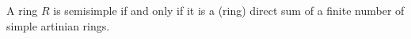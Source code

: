 A ring $R$ is semisimple if and only if it is a (ring) direct sum of a finite number of simple artinian rings.
